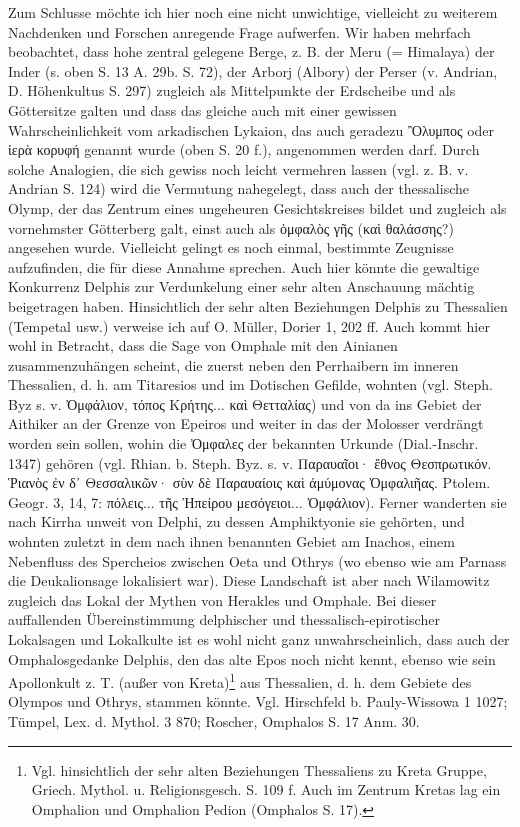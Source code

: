 \documentclass[a4paper, 11pt, oneside]{article}
\begin{document}
Zum Schlusse möchte ich hier noch eine nicht unwichtige, vielleicht zu weiterem Nachdenken und Forschen anregende Frage aufwerfen. Wir haben mehrfach beobachtet, dass hohe zentral gelegene Berge, z. B. der Meru (= Himalaya) der Inder (s. oben S. 13 A. 29b. S. 72), der Arborj (Albory) der Perser (v. Andrian, D. Höhenkultus S. 297) zugleich als Mittelpunkte der Erdscheibe und als Göttersitze galten und dass das gleiche auch mit einer gewissen Wahrscheinlichkeit vom arkadischen Lykaion, das auch geradezu Ὂλυμπος oder ἱερὰ κορυφή genannt wurde (oben S. 20 f.), angenommen werden darf. Durch solche Analogien, die sich gewiss noch leicht vermehren lassen (vgl. z. B. v. Andrian S. 124) wird die Vermutung nahegelegt, dass auch der thessalische Olymp, der das Zentrum eines ungeheuren Gesichtskreises bildet und zugleich als vornehmster Götterberg galt, einst auch als ὀμφαλὸς γῆς (καὶ θαλάσσης?) angesehen wurde. Vielleicht gelingt es noch einmal, bestimmte Zeugnisse aufzufinden, die für diese Annahme sprechen. Auch hier könnte die gewaltige Konkurrenz Delphis zur Verdunkelung einer sehr alten Anschauung mächtig beigetragen haben. Hinsichtlich der sehr alten Beziehungen Delphis zu Thessalien (Tempetal usw.) verweise ich auf O. Müller, Dorier 1, 202 ff. Auch kommt hier wohl in Betracht, dass die Sage von Omphale mit den Ainianen zusammenzuhängen scheint, die zuerst neben den Perrhaibern im inneren Thessalien, d. h. am Titaresios und im Dotischen Gefilde, wohnten (vgl. Steph. Byz s. v. Ὀμφάλιον, τόπος Κρήτης... καὶ Θετταλίας) und von da ins Gebiet der Aithiker an der Grenze von Epeiros und weiter in das der Molosser verdrängt worden sein sollen, wohin die Ὀμφαλες der bekannten Urkunde (Dial.-Inschr. 1347) gehören (vgl. Rhian. b. Steph. Byz. s. v. Παραυαῖοι· ἔθνος Θεσπρωτικόν. Ῥιανὸς ἐν δ᾽ Θεσσαλικῶν· σὺν δὲ Παραυαίοις καὶ ἀμύμονας Ὀμφαλιῆας. Ptolem. Geogr. 3, 14, 7: πόλεις... τῆς Ἠπείρου μεσόγειοι... Ὀμφάλιον). Ferner wanderten sie nach Kirrha unweit von Delphi, zu dessen Amphiktyonie sie gehörten, und wohnten zuletzt in dem nach ihnen benannten Gebiet am Inachos, einem Nebenfluss des Spercheios zwischen Oeta und Othrys (wo ebenso wie am Parnass die Deukalionsage lokalisiert war). Diese Landschaft ist aber nach Wilamowitz zugleich das Lokal der Mythen von Herakles und Omphale. Bei dieser auffallenden Übereinstimmung delphischer und thessalisch-epirotischer Lokalsagen und Lokalkulte ist es wohl nicht ganz unwahrscheinlich, dass auch der Omphalosgedanke Delphis, den das alte Epos noch nicht kennt, ebenso wie sein Apollonkult z. T. (außer von Kreta)\footnote{Vgl. hinsichtlich der sehr alten Beziehungen Thessaliens zu Kreta Gruppe, Griech. Mythol. u. Religionsgesch. S. 109 f. Auch im Zentrum Kretas lag ein Omphalion und Omphalion Pedion (Omphalos S. 17).} aus Thessalien, d. h. dem Gebiete des Olympos und Othrys, stammen könnte. Vgl. Hirschfeld b. Pauly-Wissowa 1 1027; Tümpel, Lex. d. Mythol. 3 870; Roscher, Omphalos S. 17 Anm. 30.
\end{document}
